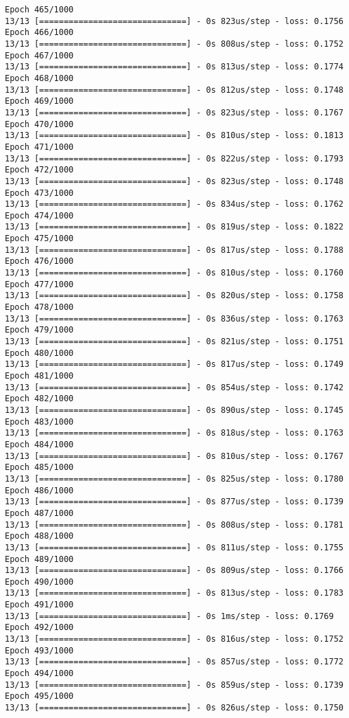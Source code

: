 \documentclass[11pt]{article}
\begin{document}
\begin{Verbatim}[commandchars=\\\{\}]
Epoch 465/1000
13/13 [==============================] - 0s 823us/step - loss: 0.1756
Epoch 466/1000
13/13 [==============================] - 0s 808us/step - loss: 0.1752
Epoch 467/1000
13/13 [==============================] - 0s 813us/step - loss: 0.1774
Epoch 468/1000
13/13 [==============================] - 0s 812us/step - loss: 0.1748
Epoch 469/1000
13/13 [==============================] - 0s 823us/step - loss: 0.1767
Epoch 470/1000
13/13 [==============================] - 0s 810us/step - loss: 0.1813
Epoch 471/1000
13/13 [==============================] - 0s 822us/step - loss: 0.1793
Epoch 472/1000
13/13 [==============================] - 0s 823us/step - loss: 0.1748
Epoch 473/1000
13/13 [==============================] - 0s 834us/step - loss: 0.1762
Epoch 474/1000
13/13 [==============================] - 0s 819us/step - loss: 0.1822
Epoch 475/1000
13/13 [==============================] - 0s 817us/step - loss: 0.1788
Epoch 476/1000
13/13 [==============================] - 0s 810us/step - loss: 0.1760
Epoch 477/1000
13/13 [==============================] - 0s 820us/step - loss: 0.1758
Epoch 478/1000
13/13 [==============================] - 0s 836us/step - loss: 0.1763
Epoch 479/1000
13/13 [==============================] - 0s 821us/step - loss: 0.1751
Epoch 480/1000
13/13 [==============================] - 0s 817us/step - loss: 0.1749
Epoch 481/1000
13/13 [==============================] - 0s 854us/step - loss: 0.1742
Epoch 482/1000
13/13 [==============================] - 0s 890us/step - loss: 0.1745
Epoch 483/1000
13/13 [==============================] - 0s 818us/step - loss: 0.1763
Epoch 484/1000
13/13 [==============================] - 0s 810us/step - loss: 0.1767
Epoch 485/1000
13/13 [==============================] - 0s 825us/step - loss: 0.1780
Epoch 486/1000
13/13 [==============================] - 0s 877us/step - loss: 0.1739
Epoch 487/1000
13/13 [==============================] - 0s 808us/step - loss: 0.1781
Epoch 488/1000
13/13 [==============================] - 0s 811us/step - loss: 0.1755
Epoch 489/1000
13/13 [==============================] - 0s 809us/step - loss: 0.1766
Epoch 490/1000
13/13 [==============================] - 0s 813us/step - loss: 0.1783
Epoch 491/1000
13/13 [==============================] - 0s 1ms/step - loss: 0.1769
Epoch 492/1000
13/13 [==============================] - 0s 816us/step - loss: 0.1752
Epoch 493/1000
13/13 [==============================] - 0s 857us/step - loss: 0.1772
Epoch 494/1000
13/13 [==============================] - 0s 859us/step - loss: 0.1739
Epoch 495/1000
13/13 [==============================] - 0s 826us/step - loss: 0.1750

\end{Verbatim}
\end{document}
